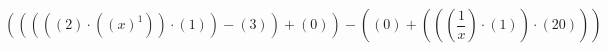 \documentclass[12pt]{article}
\begin{document}
\begin{equation}
(((((2) \cdot ((x)^{1})) \cdot (1)) - (3)) + (0)) - ((0) + (((\frac{1}{x}) \cdot (1)) \cdot (20)))
\end{equation}
\end{document}
